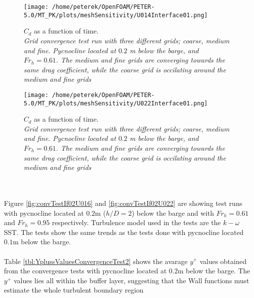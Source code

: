 \documentclass[a4paper, 12pt]{report}
\begin{document}
\begin{minipage}{.45\textwidth} 
	\begin{figure}[H]
		\centering
		\texttt{[image: /home/peterek/OpenFOAM/PETER-5.0/MT\_PK/plots/meshSensitivity/U014Interface01.png]}
		\caption{$C_d$ as a function of time. \\ \textit{Grid convergence test run with three different grids; coarse, medium and fine. Pycnocline located at $0.2$ m below the barge, and $Fr_h = 0.61$. The medium and fine grids are converging towards the same drag coefficient, while the coarse grid is occilating around the medium and fine grids}}
		\label{fig:convTestIf01U01}
	\end{figure}
\end{minipage}\hfill
\vspace{2ex}
\begin{minipage}{.45\textwidth} 
	\begin{figure}[H]
		\centering
		\texttt{[image: /home/peterek/OpenFOAM/PETER-5.0/MT\_PK/plots/meshSensitivity/U022Interface01.png]}
		\caption{$C_d$ as a function of time. \\ \textit{Grid convergence test run with three different grids; coarse, medium and fine. Pycnocline located at $0.2$ m below the barge, and $Fr_h = 0.61$. The medium and fine grids are converging towards the same drag coefficient, while the coarse grid is occilating around the medium and fine grids}}
		\label{fig:convTestIf01U022}
	\end{figure}
\end{minipage}\hfill
\vspace{2ex}\\
\\
Figure \ref{fig:convTestIf02U016} and \ref{fig:convTestIf02U022} are showing test runs with pycnocline located at $0.2$m ($h/D=2$) below the barge and with $Fr_h = 0.61$ and $Fr_h = 0.95$ respectively. Turbulence model used in the tests are the $k-\omega$ SST. The tests show the same trends as the tests done with pycnocline located $0.1$m below the barge.\\
\\
Table \ref{tbl:YplussValuesConvergenceTest2} shows the avarage $y^+$ values obtained from the convergence tests with pycnocline located at $0.2$m below the barge. The $y^+$ values lies all within the buffer layer, suggesting that the Wall functions must estimate the whole turbulent boundary region
\end{document}
